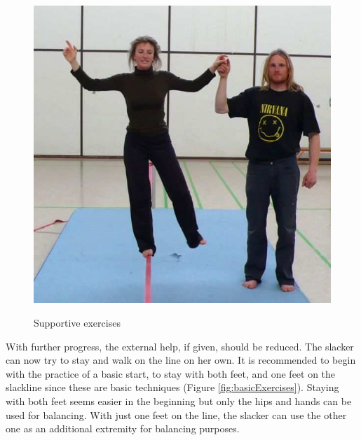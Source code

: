 \begin{figure}[htb]
\begin{minipage}[t]{0.37\linewidth}
		\label{fig:slacklineHelpBar}
	\end{minipage}
	\hfill
	\begin{minipage}[t]{0.3\linewidth}
		\centering
		\includegraphics[width=1\linewidth]{Pictures/slacklineHelpHuman}
		\label{fig:slacklineHelpHuman}
	\end{minipage}
	\caption{Supportive exercises~\cite{Kroiss2007-ab}}
	\label{fig:supportiveExercises}
\end{figure}

With further progress, the external help, if given, should be reduced. The slacker can now try to stay and walk on the line on her own. It is recommended to begin with the practice of a basic start, to stay with both feet, and one feet on the slackline since these are basic techniques (Figure \ref{fig:basicExercises}). Staying with both feet seems easier in the beginning but only the hips and hands can be used for balancing. With just one feet on the line, the slacker can use the other one as an additional extremity for balancing purposes.

